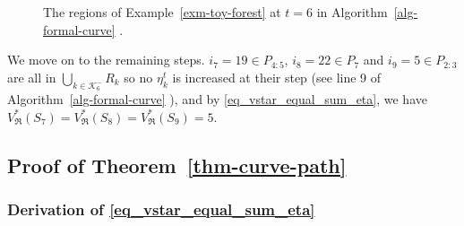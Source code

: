 \documentclass[
  11pt,
  a4paper,
]{article}
\theoremstyle{plain}
\theoremstyle{plain}
\theoremstyle{plain}
\theoremstyle{definition}
\theoremstyle{definition}
\theoremstyle{remark}
\begin{document}
\begin{figure}


\caption{\label{fig-t6}The regions of Example~\ref{exm-toy-forest} at
\(t=6\) in  Algorithm~\ref{alg-formal-curve} .}

\end{figure}%

We move on to the remaining steps. \(i_7=19\in P_{4:5}\),
\(i_8=22\in P_{7}\) and \(i_9=5\in P_{2:3}\) are all in
\(\bigcup_{k\in\mathcal{K}^-_6}R_k\) so no \(\eta_k^t\) is increased at
their step (see line 9 of  Algorithm~\ref{alg-formal-curve} ), and by
\eqref{eq_vstar_equal_sum_eta}, we have
\(V^*_{\mathfrak{R}}(S_7)=V^*_{\mathfrak{R}}(S_8)=V^*_{\mathfrak{R}}(S_9)=5\).

\subsection{\texorpdfstring{Proof of
Theorem~\ref{thm-curve-path}}{Proof of Theorem~}}\label{sec-proof}

\subsubsection{\texorpdfstring{Derivation of
\eqref{eq_vstar_equal_sum_eta}}{Derivation of }}\label{derivation-of}
\end{document}

